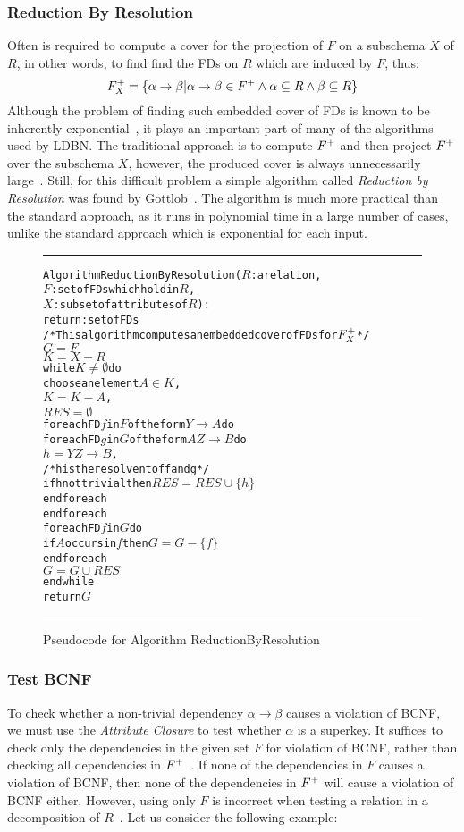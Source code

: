 \subsubsection{Reduction By Resolution}
Often is required to compute a cover for the projection of $F$ on a subschema $X$ of $R$, in 
other words, to find find the FDs on $R$ which are induced by $F$, thus:
\[ 
  F\sb{X}\sp{+} = \{\alpha\rightarrow\beta | \alpha \rightarrow \beta \in F\sp{+} \wedge \alpha \subseteq R \wedge \beta \subseteq R\}
\]
Although the problem of
finding such embedded cover of FDs is
known to be inherently exponential~\cite{p11}, it plays an important part of many of the algorithms
used by LDBN. The traditional approach is to compute $F\sp{+}$ and then project $F\sp{+}$ over the subschema $X$,
however, the produced cover
is always unnecessarily large~\cite{p4}. Still, for this difficult problem a simple 
algorithm called \textit{Reduction by Resolution}
was found by Gottlob~\cite{p4}. The algorithm is much more practical than the standard approach,
as it runs in polynomial time in a large number of cases, unlike the standard approach
which is exponential for each input. 

\begin{figure}[htbp]
\hrule
\vspace{0.25cm}
\begin{alltt}
Algorithm ReductionByResolution(\(R\): a relation,
                  \(F\) : set of FDs which hold in \(R\),
                  \(X\) : subset of attributes of \(R\)):
             return: set of FDs
/* This algorithm computes an embedded cover of FDs for \(F\sb{X}\sp{+}\) */
  \(G = F\)
  \(K = X - R\)
  while \(K \neq \emptyset\) do
    choose an element \(A \in K\),
    \(K = K - A\),
    \(RES = \emptyset\)
    foreach FD \(f\) in \(F\) of the form \(Y \rightarrow A\) do
      foreach FD \(g\) in \(G\) of the form \(AZ \rightarrow B\) do
        \(h = YZ \rightarrow B\),
        /* h is the resolvent of f and g */
        if h not trivial then \(RES = RES \cup \{h\}\)
      end foreach
    end foreach
    foreach FD \(f\) in \(G\) do
      if \(A\) occurs in \(f\) then \(G = G - \{f\}\)
    end foreach
    \(G = G \cup RES\)
  end while
  return \(G\)
\end{alltt}
\caption{Pseudocode for Algorithm ReductionByResolution}\label{alg:rbr}
\hrule
\end{figure}

\subsubsection{Test BCNF}
To check whether a non-trivial dependency $\alpha \rightarrow \beta$  causes a violation of BCNF,
we must use the \textit{Attribute Closure} to test whether $\alpha$ is a superkey. 
It suffices to check only the dependencies in the given set $F$ for violation of BCNF, 
rather than checking all dependencies in $F\sp{+}$~\cite{bdb4}.  
If none of the dependencies in $F$ causes a violation of BCNF, 
then none of the dependencies in $F\sp{+}$ will cause a violation of BCNF either.
However, using only $F$ is incorrect when testing a relation in a decomposition of $R$~\cite{bdb4}.
Let us consider the following example:


